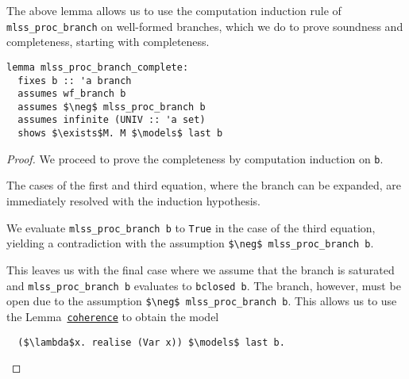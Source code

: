 \documentclass[sigplan,10pt,anonymous,review]{acmart}
\begin{document}
\noindent The above lemma allows us to use the computation induction rule of \lstinline!mlss_proc_branch! on well-formed branches, which we do to prove soundness and completeness, starting with completeness.
\begin{lstlisting}[belowskip=0pt]
lemma mlss_proc_branch_complete:
  fixes b :: 'a branch
  assumes wf_branch b
  assumes $\neg$ mlss_proc_branch b
  assumes infinite (UNIV :: 'a set)
  shows $\exists$M. M $\models$ last b
\end{lstlisting}
\begin{proof}
  We proceed to prove the completeness by computation induction on \lstinline!b!.

  The cases of the first and third equation, where the branch can be expanded, are immediately resolved with the induction hypothesis.

  We evaluate \lstinline!mlss_proc_branch b! to \lstinline!True! in the case of the third equation, yielding a contradiction with the assumption \lstinline!$\neg$ mlss_proc_branch b!.

  This leaves us with the final case where we assume that the branch is saturated and \lstinline!mlss_proc_branch b! evaluates to \lstinline!bclosed b!.
  The branch, however, must be open due to the assumption \lstinline!$\neg$ mlss_proc_branch b!.
  This allows us to use the Lemma~\hyperref[lst:coherence]{\lstinline!coherence!} to obtain the model
\begin{lstlisting}
  ($\lambda$x. realise (Var x)) $\models$ last b.
\end{lstlisting}
\end{proof}
\end{document}
